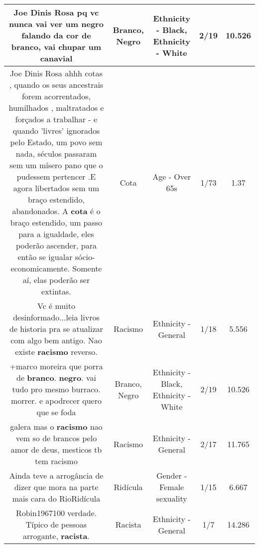 \documentclass[11pt]{article}
\newlength\mylength
\begin{document}
\begin{center}
\begin{longtable}{|C{.65\mylength}|C{.30\mylength}|C{.12\mylength}|C{.12\mylength}|C{.12\mylength}|}
  \small Joe Dinis Rosa pq vc nunca vai ver um \textbf{negro} falando da cor de \textbf{branco}, vai chupar um canavial\normalsize   & Branco, Negro & Ethnicity - Black, Ethnicity - White & 2/19 & 10.526 \\  \hline
  \small Joe Dinis Rosa  ahhh cotas , quando os seus ancestrais forem acorrentados, humilhados , maltratados e forçados a trabalhar - e quando 'livres' ignorados pelo Estado, um povo sem nada, séculos passaram sem um mísero pano que o pudessem pertencer .E agora libertados sem um braço estendido, abandonados. A \textbf{cota} é o braço estendido, um passo para a igualdade,  eles poderão ascender, para então se igualar sócio-economicamente. Somente aí, elas poderão ser extintas.\normalsize   & Cota & Age - Over 65s & 1/73 & 1.37 \\  \hline
  \small Vc é muito desinformado...leia livros de historia pra se atualizar com algo bem antigo. Nao existe \textbf{racismo} reverso.\normalsize   & Racismo & Ethnicity - General & 1/18 & 5.556 \\  \hline
  \small +marco moreira que porra de \textbf{branco}. \textbf{negro}. vai tudo pro mesmo burraco. morrer. e apodrecer quero que se foda\normalsize   & Branco, Negro & Ethnicity - Black, Ethnicity - White & 2/19 & 10.526 \\  \hline
  \small galera mas o \textbf{racismo} nao vem so de brancos pelo amor de deus, mesticos tb tem racismo\normalsize   & Racismo & Ethnicity - General & 2/17 & 11.765 \\  \hline
  \small Ainda teve a arrogância de dizer que mora na parte mais cara do RioRidícula\normalsize   & Ridícula & Gender - Female sexuality & 1/15 & 6.667 \\  \hline
  \small Robin1967100 verdade. Típico de pessoas arrogante, \textbf{racista}.\normalsize   & Racista & Ethnicity - General & 1/7 & 14.286 \\  \hline

\end{longtable}
\end{center}
\end{document}
